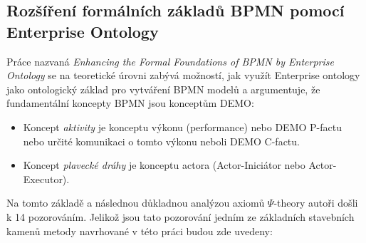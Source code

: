 \documentclass[]{article}
\newcommand{\ptheory}{$\Psi$-theory }
\begin{document}
\subsection{Rozšíření formálních základů BPMN pomocí Enterprise Ontology}

Práce \cite{VanNuffel2009} nazvaná \textit{Enhancing the Formal Foundations of BPMN by Enterprise Ontology} se na teoretické úrovni zabývá možností, jak využít Enterprise ontology jako ontologický základ pro vytváření BPMN modelů a argumentuje, že fundamentální koncepty BPMN jsou  konceptům DEMO:

\begin{itemize}
\item Koncept \textit{aktivity} je  konceptu výkonu (performance) nebo DEMO P-factu nebo určité komunikaci o tomto výkonu neboli DEMO C-factu.
\item Koncept \textit{plavecké dráhy} je  konceptu actora (Actor-Iniciátor nebo Actor-Executor).
\end{itemize}

Na tomto základě a následnou důkladnou analýzou axiomů \ptheory autoři došli k 14 pozorováním. Jelikož jsou tato pozorování jedním ze základních stavebních kamenů metody navrhované v této práci budou zde uvedeny:
\end{document}
